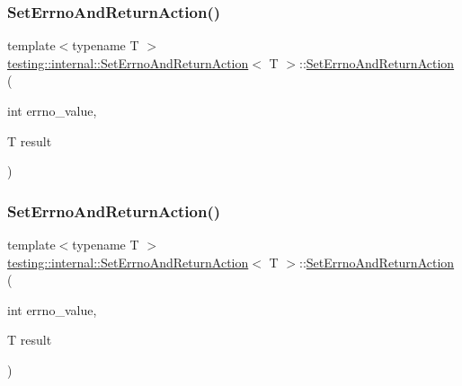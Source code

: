 \subsubsection{\texorpdfstring{SetErrnoAndReturnAction()}{SetErrnoAndReturnAction()}\hspace{0.1cm}{\footnotesize\ttfamily [1/3]}}
{\footnotesize\ttfamily template$<$typename T $>$ \\
\mbox{\hyperlink{classtesting_1_1internal_1_1_set_errno_and_return_action}{testing\+::internal\+::\+Set\+Errno\+And\+Return\+Action}}$<$ T $>$\+::\mbox{\hyperlink{classtesting_1_1internal_1_1_set_errno_and_return_action}{Set\+Errno\+And\+Return\+Action}} (\begin{DoxyParamCaption}\item[{int}]{errno\+\_\+value,  }\item[{T}]{result }\end{DoxyParamCaption})\hspace{0.3cm}{\ttfamily [inline]}}

\mbox{\label{classtesting_1_1internal_1_1_set_errno_and_return_action_abfe5a194a9b8f2b303c635ad99b3a257}} 
\subsubsection{\texorpdfstring{SetErrnoAndReturnAction()}{SetErrnoAndReturnAction()}\hspace{0.1cm}{\footnotesize\ttfamily [2/3]}}
{\footnotesize\ttfamily template$<$typename T $>$ \\
\mbox{\hyperlink{classtesting_1_1internal_1_1_set_errno_and_return_action}{testing\+::internal\+::\+Set\+Errno\+And\+Return\+Action}}$<$ T $>$\+::\mbox{\hyperlink{classtesting_1_1internal_1_1_set_errno_and_return_action}{Set\+Errno\+And\+Return\+Action}} (\begin{DoxyParamCaption}\item[{int}]{errno\+\_\+value,  }\item[{T}]{result }\end{DoxyParamCaption})\hspace{0.3cm}{\ttfamily [inline]}}

